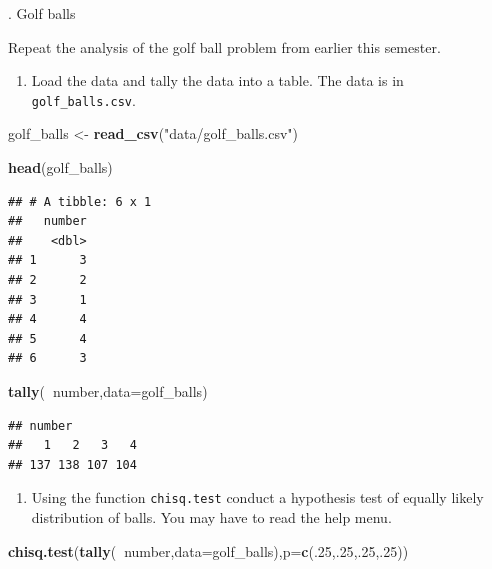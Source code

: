 \documentclass[
]{book}
\newenvironment{Shaded}{\begin{snugshade}}{\end{snugshade}}
\newcommand{\DataTypeTok}[1]{\textcolor[rgb]{0.13,0.29,0.53}{#1}}
\newcommand{\DecValTok}[1]{\textcolor[rgb]{0.00,0.00,0.81}{#1}}
\newcommand{\KeywordTok}[1]{\textcolor[rgb]{0.13,0.29,0.53}{\textbf{#1}}}
\newcommand{\NormalTok}[1]{#1}
\newcommand{\OperatorTok}[1]{\textcolor[rgb]{0.81,0.36,0.00}{\textbf{#1}}}
\newcommand{\StringTok}[1]{\textcolor[rgb]{0.31,0.60,0.02}{#1}}
\providecommand{\tightlist}{%
  \setlength{\itemsep}{0pt}\setlength{\parskip}{0pt}}
\begin{document}
. Golf balls

Repeat the analysis of the golf ball problem from earlier this semester.

\begin{enumerate}
\def\labelenumi{\alph{enumi}.}
\tightlist
\item
  Load the data and tally the data into a table. The data is in \texttt{golf\_balls.csv}.
\end{enumerate}

\begin{Shaded}
\begin{Highlighting}[]
\NormalTok{golf_balls <-}\StringTok{ }\KeywordTok{read_csv}\NormalTok{(}\StringTok{"data/golf_balls.csv"}\NormalTok{)}
\end{Highlighting}
\end{Shaded}

\begin{Shaded}
\begin{Highlighting}[]
\KeywordTok{head}\NormalTok{(golf_balls)}
\end{Highlighting}
\end{Shaded}

\begin{verbatim}
## # A tibble: 6 x 1
##   number
##    <dbl>
## 1      3
## 2      2
## 3      1
## 4      4
## 5      4
## 6      3
\end{verbatim}

\begin{Shaded}
\begin{Highlighting}[]
\KeywordTok{tally}\NormalTok{(}\OperatorTok{~}\NormalTok{number,}\DataTypeTok{data=}\NormalTok{golf_balls)}
\end{Highlighting}
\end{Shaded}

\begin{verbatim}
## number
##   1   2   3   4 
## 137 138 107 104
\end{verbatim}

\begin{enumerate}
\def\labelenumi{\alph{enumi}.}
\setcounter{enumi}{1}
\tightlist
\item
  Using the function \texttt{chisq.test} conduct a hypothesis test of equally likely distribution of balls. You may have to read the help menu.
\end{enumerate}

\begin{Shaded}
\begin{Highlighting}[]
\KeywordTok{chisq.test}\NormalTok{(}\KeywordTok{tally}\NormalTok{(}\OperatorTok{~}\NormalTok{number,}\DataTypeTok{data=}\NormalTok{golf_balls),}\DataTypeTok{p=}\KeywordTok{c}\NormalTok{(.}\DecValTok{25}\NormalTok{,.}\DecValTok{25}\NormalTok{,.}\DecValTok{25}\NormalTok{,.}\DecValTok{25}\NormalTok{))}
\end{Highlighting}
\end{Shaded}
\end{document}
